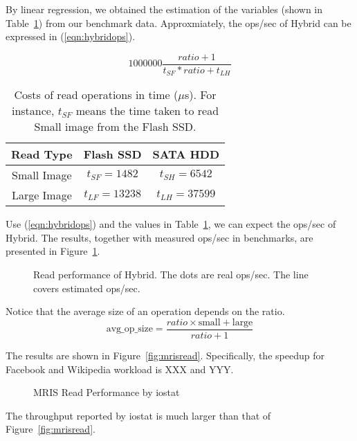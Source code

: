 By linear regression, we obtained the estimation of the variables
(shown in Table~\ref{tbl:variable}) from our benchmark data.
Approxmiately, the ops/sec of Hybrid can be expressed in
(\ref{eqn:hybridops}).

\begin{equation}
\label{eqn:hybridops}
    1000000 \frac{ratio + 1}{t_{SF} * ratio + t_{LH}}
\end{equation}

\begin{table}[tc]
{\centering \footnotesize
\begin{tabular}{c|c|c}
\hline 
  Read Type & Flash SSD & SATA HDD \\ \hline
  Small Image & $t_{SF} = 1482$ & $t_{SH} = 6542$ \\ 
  Large Image & $t_{LF} = 13238$ & $t_{LH} = 37599$ \\ \hline
\end{tabular}
 \caption{Costs of read operations in time ($\mu$s). For instance,
$t_{SF}$ means the time taken to read Small image from the Flash SSD.}
\label{tbl:variable}
}
\end{table}

Use (\ref{eqn:hybridops}) and the values in Table~\ref{tbl:variable},
we can expect the ops/sec of Hybrid. The results, together with
measured ops/sec in benchmarks, are presented in
Figure~\ref{fig:readesti}.

\begin{figure}[t]
\begin{centering}
\caption{Read performance of Hybrid. The dots are real ops/sec. The
line covers estimated ops/sec.}
\label{fig:readesti}
\end{centering}
\end{figure}



Notice that the average size of an operation depends on the ratio.
$$
\mbox{avg\_op\_size} = \frac{ratio \times \mbox{small} +
    \mbox{large}}{ratio + 1}
$$

The results are shown in Figure~\ref{fig:mrisread}.  Specifically, the
speedup for Facebook and Wikipedia workload is XXX and YYY. 

\begin{figure}[t]
\begin{centering}
\caption{MRIS Read Performance by iostat}
\label{fig:mrisiostat}
\end{centering}
\end{figure}

The throughput reported by iostat is much larger than that of
Figure~\ref{fig:mrisread}.


